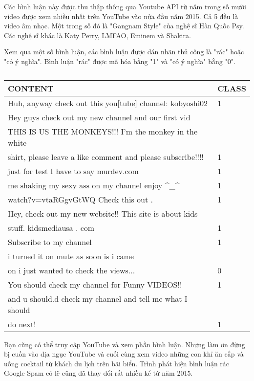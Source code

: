 Các bình luận này được thu thập thông qua Youtube API từ năm trong số mười video được xem nhiều nhất trên YouTube vào nửa đầu năm 2015. Cả 5 đều là video âm nhạc. Một trong số đó là "Gangnam Style" của nghệ sĩ Hàn Quốc Psy. Các nghệ sĩ khác là Katy Perry, LMFAO, Eminem và Shakira.

Xem qua một số bình luận, các bình luận được dán nhãn thủ công là "rác" hoặc "có ý nghĩa". Bình luận "rác" được mã hóa bằng "1" và "có ý nghĩa" bằng "0".

\begin{table}[h!]
\caption{}
\label{tab:my-table}
\begin{tabular}{|l|l|}
\hline
CONTENT  & CLASS \\ \hline
Huh, anyway check out this you{[}tube{]} channel: kobyoshi02 & 1 \\ \hline
Hey guys check out my new channel and our first vid \\ THIS IS US THE MONKEYS!!! I'm the monkey in the white \\   shirt, please leave a like comment and please subscribe!!!! & 1 \\ \hline
just for test I have to say murdev.com  & 1     \\ \hline
me shaking my sexy ass on my channel enjoy \textasciicircum{}\_\textasciicircum{}  & 1     \\ \hline
watch?v=vtaRGgvGtWQ Check this out . & 1 \\ \hline
Hey, check out my new website!! This site is about kids \\  stuff. kidsmediausa . com   & 1     \\ \hline
Subscribe to my channel & 1     \\ \hline
i turned it on mute as soon is i came \\ on i just wanted to check the views... & 0     \\ \hline
You should check my channel for Funny VIDEOS!!  & 1     \\ \hline
and u should.d check my channel and tell me what I should \\ do next!  & 1     \\ \hline
\end{tabular}
\end{table}

Bạn cũng có thể truy cập YouTube và xem phần bình luận. Nhưng làm ơn đừng bị cuốn vào địa ngục YouTube và cuối cùng xem video những con khỉ ăn cắp và uống cocktail từ khách du lịch trên bãi biển. Trình phát hiện bình luận rác Google Spam có lẽ cũng đã thay đổi rất nhiều kể từ năm 2015.

